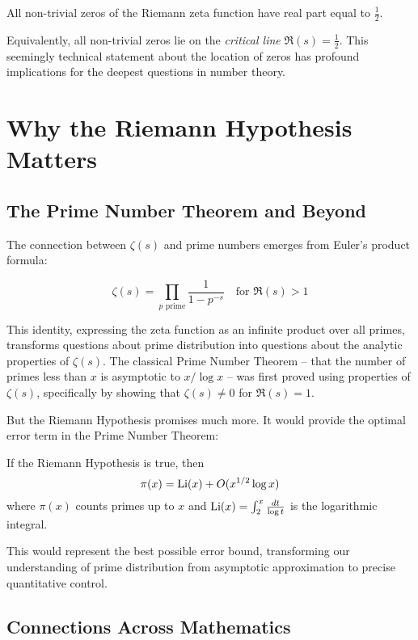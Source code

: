 \begin{hypothesis}
All non-trivial zeros of the Riemann zeta function have real part equal to $\frac{1}{2}$.
\end{hypothesis}

Equivalently, all non-trivial zeros lie on the \emph{critical line} $\Re(s) = \frac{1}{2}$. This seemingly technical statement about the location of zeros has profound implications for the deepest questions in number theory.

\section*{Why the Riemann Hypothesis Matters}

\subsection*{The Prime Number Theorem and Beyond}

The connection between $\zeta(s)$ and prime numbers emerges from Euler's product formula:

\begin{equation}
\zeta(s) = \prod_{p \text{ prime}} \frac{1}{1 - p^{-s}} \quad \text{for } \Re(s) > 1
\end{equation}

This identity, expressing the zeta function as an infinite product over all primes, transforms questions about prime distribution into questions about the analytic properties of $\zeta(s)$. The classical Prime Number Theorem -- that the number of primes less than $x$ is asymptotic to $x/\log x$ -- was first proved using properties of $\zeta(s)$, specifically by showing that $\zeta(s) \neq 0$ for $\Re(s) = 1$.

But the Riemann Hypothesis promises much more. It would provide the optimal error term in the Prime Number Theorem:

\begin{theorem}[Consequence of RH]
If the Riemann Hypothesis is true, then
$$\pi(x) = \operatorname{Li}(x) + O(x^{1/2} \log x)$$
where $\pi(x)$ counts primes up to $x$ and $\operatorname{Li}(x) = \int_2^x \frac{dt}{\log t}$ is the logarithmic integral.
\end{theorem}

This would represent the best possible error bound, transforming our understanding of prime distribution from asymptotic approximation to precise quantitative control.

\subsection*{Connections Across Mathematics}

